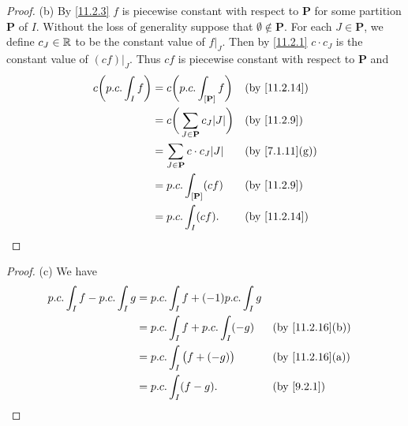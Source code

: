\begin{proof}{(b)}
  By \cref{11.2.3} \(f\) is piecewise constant with respect to \(\mathbf{P}\) for some partition \(\mathbf{P}\) of \(I\).
  Without the loss of generality suppose that \(\emptyset \notin \mathbf{P}\).
  For each \(J \in \mathbf{P}\), we define \(c_J \in \mathbb{R}\) to be the constant value of \(f|_J\).
  Then by \cref{11.2.1} \(c \cdot c_J\) is the constant value of \((cf)|_J\).
  Thus \(cf\) is piecewise constant with respect to \(\mathbf{P}\) and
  \begin{align*}
    c \bigg(p.c. \int_I f\bigg) & = c \bigg(p.c. \int_{[\mathbf{P}]} f\bigg)          &  & \by{11.2.14}                 \\
                                & = c \bigg(\sum_{J \in \mathbf{P}} c_J \abs{J}\bigg) &  & \by{11.2.9}                  \\
                                & = \sum_{J \in \mathbf{P}} c \cdot c_J \abs{J}       &  & \text{(by \cref{7.1.11}(g))} \\
                                & = p.c. \int_{[\mathbf{P}]} (c f)                    &  & \by{11.2.9}                  \\
                                & = p.c. \int_I (c f).                                &  & \by{11.2.14}
  \end{align*}
\end{proof}

\begin{proof}{(c)}
  We have
  \begin{align*}
    p.c. \int_I f - p.c. \int_I g & = p.c. \int_I f + (-1) p.c. \int_I g                                    \\
                                  & = p.c. \int_I f + p.c. \int_I (-g)   &  & \text{(by \cref{11.2.16}(b))} \\
                                  & = p.c. \int_I \big(f + (-g)\big)     &  & \text{(by \cref{11.2.16}(a))} \\
                                  & = p.c. \int_I (f - g).               &  & \by{9.2.1}
  \end{align*}
\end{proof}


